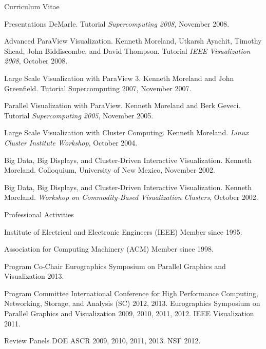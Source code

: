 \documentclass{article}
\begin{document}
\begin{cv}{Curriculum Vitae}
\begin{cvlist}{Presentations}
      DeMarle. Tutorial \emph{Supercomputing 2008}, November 2008.
    \item[Advanced ParaView Visualization.] Kenneth Moreland, Utkarsh
      Ayachit, Timothy Shead, John Biddiscombe, and David
      Thompson. Tutorial \emph{IEEE Visualization 2008}, October 2008.
    \item[Large Scale Visualization with ParaView 3.] Kenneth Moreland and
      John Greenfield. Tutorial Supercomputing 2007, November 2007.
    \item[Parallel Visualization with ParaView.] Kenneth Moreland and Berk
      Geveci. Tutorial \emph{Supercomputing 2005}, November 2005.
    \item[Large Scale Visualization with Cluster Computing.] Kenneth
      Moreland. \emph{Linux Cluster Institute Workshop}, October 2004.
    \item[Big Data, Big Displays, and Cluster-Driven Interactive
      Visualization.] Kenneth Moreland. Colloquium, University of New
      Mexico, November 2002.
    \item[Big Data, Big Displays, and Cluster-Driven Interactive
      Visualization.] Kenneth Moreland. \emph{Workshop on Commodity-Based
      Visualization Clusters}, October 2002.
    \end{cvlist}

    \begin{cvlist}{Professional Activities}
    \item[Institute of Electrical and Electronic Engineers (IEEE)]
      Member since 1995.
    \item[Association for Computing Machinery (ACM)]  Member since 1998.
    \item[Program Co-Chair] Eurographics Symposium on Parallel Graphics and
      Visualization 2013.
    \item[Program Committee]
      International Conference for High Performance Computing, Networking,
      Storage, and Analysis (SC) 2012, 2013.
      Eurographics Symposium on Parallel Graphics and Visualization 2009,
      2010, 2011, 2012.
      IEEE Visualization 2011.
    \item[Review Panels]
      DOE ASCR 2009, 2010, 2011, 2013.
      NSF 2012.
    \end{cvlist}

  \end{cv}
\end{document}
